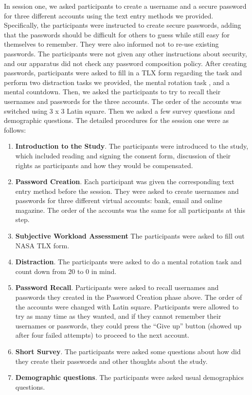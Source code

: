 \documentclass[conference]{IEEEtran}
\begin{document}
In session one, we asked participants to create a username and a secure password for three different accounts using the text entry methods we provided. 
Specifically, the participants were instructed to create secure passwords, adding that the passwords should be difficult for others to guess while still easy for themselves to remember. They were also informed not to re-use existing passwords. The participants were not given any other instructions about security, and our apparatus did not check any password composition policy. After creating passwords, participants were asked to fill in a TLX form \cite{hart:tlx} regarding the task and perform two distraction tasks we provided, the mental rotation task \cite{mentalrotation}, and a mental countdown. Then, we asked the participants to try to recall their usernames and passwords for the three accounts. The order of the accounts was switched using 3 x 3 Latin square. Then we asked a few survey questions and demographic questions. The detailed procedures for the session one were as follows:

\begin{enumerate}
\item \textbf{Introduction to the Study}. The participants were introduced to the study, which included reading and signing the consent form, discussion of their rights as participants and how they would be compensated.
\item \textbf{Password Creation}. Each participant was given the corresponding text entry method before the session. They were asked to create usernames and passwords for three different virtual accounts: bank, email and online magazine. The order of the accounts was the same for all participants at this step.
\item \textbf{Subjective Workload Assessment} The participants were asked to fill out NASA TLX form.
\item \textbf{Distraction}. The participants were asked to do a mental rotation task and count down from 20 to 0 in mind.
\item \textbf{Password Recall}. Participants were asked to recall usernames and passwords they created in the Password Creation phase above. The order of the accounts were changed with Latin square. Participants were allowed to try as many time as they wanted, and if they cannot remember their usernames or passwords, they could press the ``Give up'' button (showed up after four failed attempts) to proceed to the next account.
\item \textbf{Short Survey}. The participants were asked some questions about how did they create their passwords and other thoughts about the study.
\item \textbf{Demographic questions}. The participants were asked usual demographics questions.
\end{enumerate}
\end{document}
